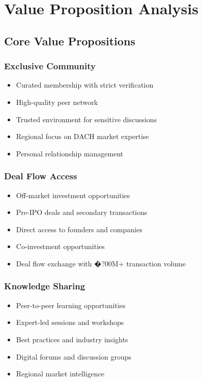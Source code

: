 \chapter{Value Proposition Analysis}

\section{Core Value Propositions}

\subsection{Exclusive Community}
\begin{itemize}
    \item Curated membership with strict verification
    \item High-quality peer network
    \item Trusted environment for sensitive discussions
    \item Regional focus on DACH market expertise
    \item Personal relationship management
\end{itemize}

\subsection{Deal Flow Access}
\begin{itemize}
    \item Off-market investment opportunities
    \item Pre-IPO deals and secondary transactions
    \item Direct access to founders and companies
    \item Co-investment opportunities
    \item Deal flow exchange with �?00M+ transaction volume
\end{itemize}

\subsection{Knowledge Sharing}
\begin{itemize}
    \item Peer-to-peer learning opportunities
    \item Expert-led sessions and workshops
    \item Best practices and industry insights
    \item Digital forums and discussion groups
    \item Regional market intelligence
\end{itemize}

